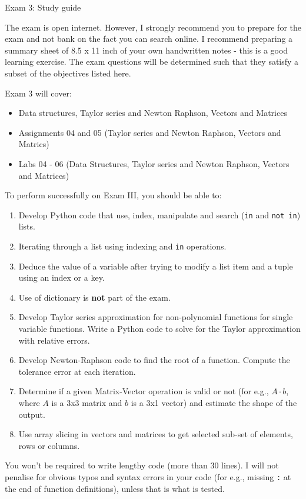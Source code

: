 \documentclass[]{article}
\begin{document}
\begin{center}
\Large Exam 3: Study guide
\end{center}

The exam is open internet. However, I strongly recommend you to prepare for the exam and not bank on the fact you can search online. I recommend preparing a summary sheet of 8.5 x 11 inch of your own handwritten notes - this is a good learning exercise. The exam questions will be determined such that they satisfy a subset of the objectives listed here.

Exam 3 will cover:
\begin{itemize}
	\item Data structures, Taylor series and Newton Raphson, Vectors and Matrices
	\item Assignments 04 and 05 (Taylor series and Newton Raphson, Vectors and Matrics)
	\item Labs 04 - 06 (Data Structures, Taylor series and Newton Raphson, Vectors and Matrices)
\end{itemize}

To perform successfully on Exam III, you should be able to:

\begin{enumerate}
	\item Develop Python code that use, index, manipulate and search (\verb|in| and \verb|not in|) lists.
	\item Iterating through a list using indexing and \verb|in| operations.
	\item Deduce the value of a variable after trying to modify a list item and a tuple using an index or a key.
	\item Use of dictionary is \textbf{not} part of the exam.
	\item Develop Taylor series approximation for non-polynomial functions for single variable functions. Write a Python code to solve for the Taylor approximation with relative errors.
	\item Develop Newton-Raphson code to find the root of a function. Compute the tolerance error at each iteration.
	\item Determine if a given Matrix-Vector operation is valid or not (for e.g., $A\cdot b$, where $A$ is a 3x3 matrix and $b$ is a 3x1 vector) and estimate the shape of the output.
	\item Use array slicing in vectors and matrices to get selected sub-set of elements, rows or columns.
\end{enumerate}

You won't be required to write lengthy code (more than 30 lines). I will not penalise for obvious typos and syntax errors in your code (for e.g., missing \verb|:| at the end of function definitions), unless that is what is tested.
\end{document}

